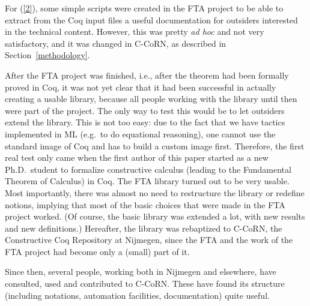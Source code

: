 \documentclass[runningheads]{llncs}
\newcommand{\ccorn}{\mbox{C-CoRN}}
\newcommand{\fta}{FTA}
\begin{document}
For (\ref{2}), some simple scripts were created in the {\fta} project to be
able to extract from the Coq input files a useful documentation for
outsiders interested in the technical content. However, this was
pretty \emph{ad hoc} and not very satisfactory, and it
was changed in {\ccorn}, as described in Section~\ref{methodology}.

After the {\fta} project was finished, i.e., after the theorem had been
formally proved in Coq, it was not yet clear that it had been
successful in actually creating a usable library, because all people
working with the library until then were part of the project. The only
way to test this would be to let outsiders extend the library.
This is not too easy:
due to the fact that we have tactics implemented in ML
(e.g.\ to do equational reasoning), one cannot use the standard image of Coq and
has to build a custom image first.
Therefore, the first real test only came when the first author
of this paper
started as a new Ph.D.\ student to formalize constructive calculus
(leading to the Fundamental Theorem of Calculus) in Coq. The {\fta}
library turned out to be very usable. Most importantly, there was almost no
need to restructure the library or redefine notions, implying that most of the
basic choices that were made in the {\fta} project worked. (Of course, the
basic library was extended a lot, with new results and new
definitions.)  Hereafter, the library was rebaptized to {\ccorn}, the
Constructive Coq Repository at Nijmegen, since the {\fta} and the work of
the {\fta} project had become only a (small) part of it.

Since then, several people, working both in Nijmegen and elsewhere,
have consulted, used and contributed to \ccorn.
These have found its 
structure (including notations, automation facilities, documentation)
quite useful.
\end{document}
